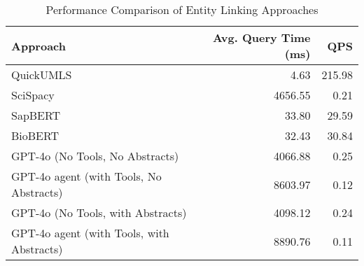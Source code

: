 \begin{table}[htbp]
\centering
\caption{Performance Comparison of Entity Linking Approaches}
\label{tab:performance}
\begin{tabular}{lrr}
\hline
\textbf{Approach} & \textbf{Avg. Query Time (ms)} & \textbf{QPS} \\
\hline
QuickUMLS & 4.63 & 215.98 \\
SciSpacy & 4656.55 & 0.21 \\
SapBERT & 33.80 & 29.59 \\
BioBERT & 32.43 & 30.84 \\
GPT-4o (No Tools, No Abstracts) & 4066.88 & 0.25 \\
GPT-4o agent (with Tools, No Abstracts) & 8603.97 & 0.12 \\
GPT-4o (No Tools, with Abstracts) & 4098.12 & 0.24 \\
GPT-4o agent (with Tools, with Abstracts) & 8890.76 & 0.11 \\
\hline
\end{tabular}
\end{table}
